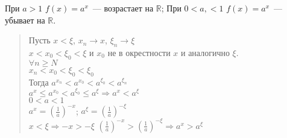 \documentclass[12pt]{article}
\begin{document}
	\begin{statement}
		При $a > 1$ $f(x) = a^x$~--- возрастает на $\mathbb{R}$; При $0 < a,< 1$ $f(x) = a^x$~--- убывает на $\mathbb{R}$.
	\end{statement}
	\begin{quote}
		Пусть $x < \xi$, $x_n \rightarrow x$, $\xi_n \rightarrow \xi$ \\
		$x < x_0 < \xi_0 < \xi$ и $x_0$ не в окрестности $x$ и аналогично $\xi$. \\
		$\forall n \geqslant N$ \\
		$x_n < x_0 < \xi_0 < \xi_0$ \\
		Тогда $a^{x_n} < a^{x_0} < a^{\xi_0} < a^{\xi_n}$ \\
		$a^{x} \leqslant a^{x_0} < a^{\xi_0} \leqslant a^{\xi} \Rightarrow a^x < a^{\xi}$ \\
		$0 < a < 1$ \\
		$a^x = (\frac{1}{a})^{-x}$; $a^{\xi} = (\frac{1}{a})^{-\xi}$ \\
		$x < \xi \Rightarrow -x > -\xi$ $(\frac{1}{a})^{-x} > (\frac{1}{a})^{-\xi} \Rightarrow a^x > a^{\xi}$
	\end{quote}
\end{document}
